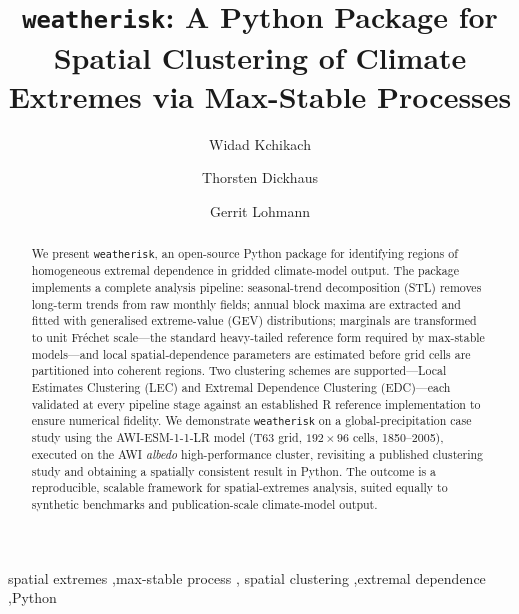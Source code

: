 \documentclass[preprint,12pt,a4paper]{elsarticle}
\newcommand{\revn}[1]{{\color{RevisionViolet}#1}}
\begin{document}
\begin{frontmatter}

\title{\texttt{weatherisk}: A Python Package for Spatial Clustering
  of Climate Extremes via Max-Stable Processes}

\author[awi,uni]{Widad Kchikach}

\author[uni]{Thorsten Dickhaus}
\author[awi,uni]{Gerrit Lohmann}

\address[awi]{Alfred Wegener Institute Helmholtz Centre for Polar
  and Marine Research, Bremerhaven, Germany}
\address[uni]{University of Bremen, Bremen, Germany}

\begin{abstract}
We present \texttt{weatherisk}, an open-source Python package for
identifying regions of homogeneous extremal dependence in gridded
climate-model output. The package implements a
complete analysis pipeline: seasonal-trend decomposition (STL) removes
long-term trends from raw monthly fields; annual block maxima are
extracted and fitted with generalised extreme-value (GEV)
distributions; marginals are transformed to unit Fr\'{e}chet
scale---the standard heavy-tailed reference form required by max-stable
models---and local spatial-dependence parameters are estimated before
grid cells are partitioned into coherent regions. Two clustering
schemes are supported---Local Estimates Clustering (LEC) and Extremal
Dependence Clustering (EDC)---each validated at every pipeline stage
against an established R reference implementation to ensure numerical
fidelity. We demonstrate \texttt{weatherisk} on a global-precipitation
case study using the AWI-ESM-1-1-LR model \revn{(T63 grid, $192\times96$
cells, 1850--2005),} executed on the AWI \emph{albedo}
high-performance cluster, \revn{revisiting a published clustering study
and obtaining a spatially consistent result in Python. The outcome}
is a reproducible, scalable framework for
spatial-extremes analysis, suited equally to synthetic benchmarks and
publication-scale climate-model output.
\end{abstract}

\begin{keyword}
spatial extremes \sep max-stable process \sep
spatial clustering \sep extremal dependence \sep Python
\end{keyword}

\end{frontmatter}

\end{document}
